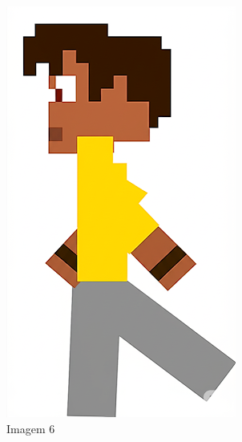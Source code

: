 \begin{figure}[htbp]
\begin{subfigure}{0.23\linewidth}
        \includegraphics[width=1\linewidth]{figs/geminiPro/chat10/tela1_res2_6.PNG}
        \caption{\small Imagem 6}
        \label{fig:geminiProSheet5_2f}
    \end{subfigure}
    \begin{subfigure}{0.23\linewidth}

\end{subfigure}
\end{figure}
